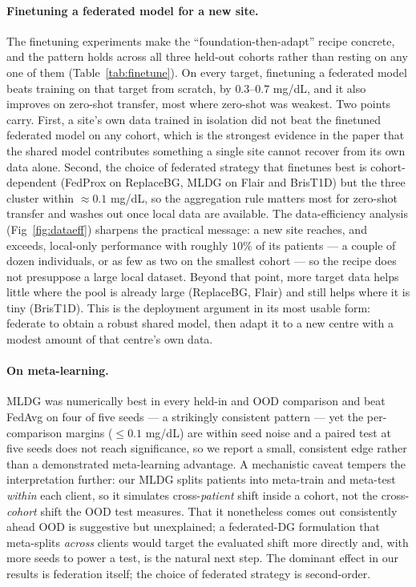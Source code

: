 \documentclass[10pt,letterpaper]{article}
\begin{document}
\paragraph{Finetuning a federated model for a new site.} The finetuning
experiments make the ``foundation-then-adapt'' recipe concrete, and the pattern
holds across all three held-out cohorts rather than resting on any one of them
(Table~\ref{tab:finetune}). On every target, finetuning a federated model
beats training on that target from scratch, by $0.3$--$0.7$ mg/dL, and it also
improves on zero-shot transfer, most where zero-shot was weakest. Two points
carry. First, a site's own data trained in isolation did not beat the finetuned
federated model on any cohort, which is the strongest evidence in the paper that
the shared model contributes something a single site cannot recover from its own
data alone. Second, the choice of federated strategy that finetunes best is
cohort-dependent (FedProx on ReplaceBG, MLDG on Flair and BrisT1D) but the three
cluster within $\approx 0.1$ mg/dL, so the aggregation rule matters most for
zero-shot transfer and washes out once local data are available. The
data-efficiency analysis (Fig~\ref{fig:dataeff}) sharpens the practical message: a
new site reaches, and exceeds, local-only performance with roughly $10\%$ of its
patients --- a couple of dozen individuals, or as few as two on the smallest
cohort --- so the recipe does not presuppose a large local dataset. Beyond that
point, more target data helps little where the pool is already large (ReplaceBG,
Flair) and still helps where it is tiny (BrisT1D). This is the deployment argument
in its most usable form: federate to obtain a robust shared model, then adapt it
to a new centre with a modest amount of that centre's own data.

\paragraph{On meta-learning.} MLDG was numerically best in every held-in and OOD
comparison and beat FedAvg on four of five seeds --- a strikingly consistent
pattern --- yet the per-comparison margins ($\le 0.1$ mg/dL) are within seed
noise and a paired test at five seeds does not reach significance, so we report a
small, consistent edge rather than a demonstrated meta-learning advantage. A
mechanistic caveat tempers the interpretation further: our MLDG splits patients
into meta-train and meta-test \emph{within} each client, so it simulates
cross-\emph{patient} shift inside a cohort, not the cross-\emph{cohort} shift the
OOD test measures. That it nonetheless comes out consistently ahead OOD is
suggestive but unexplained; a federated-DG formulation that meta-splits
\emph{across} clients would target the evaluated shift more directly and, with
more seeds to power a test, is the natural next step. The dominant effect in our
results is federation itself; the choice of federated strategy is second-order.
\end{document}

